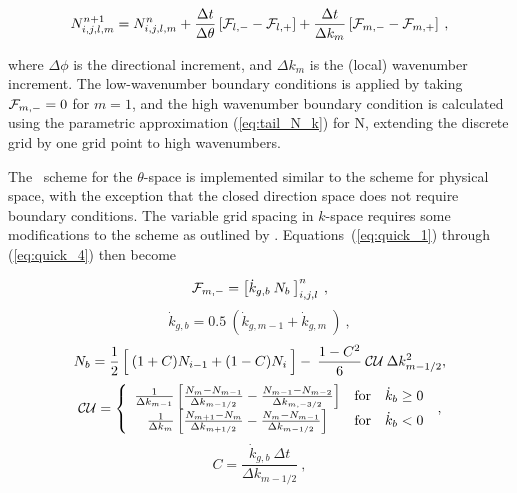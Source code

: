 
\begin{equation}
N_{i,j,l,m}^{n+1} = N_{i,j,l,m}^n 
 + \frac{\Delta t}{\Delta \theta} \left [ {\cal F}_{l,-} - {\cal F}_{l,+} \right ]
 + \frac{\Delta t}{\Delta k_m} \left [ {\cal F}_{m,-} - {\cal F}_{m,+} \right ]
\: , \label{eq:1up_intra_tot} \end{equation}

\noindent
where $\Delta \phi$ is the directional increment, and $\Delta k_m$ is the
(local) wavenumber increment. The low-wavenumber boundary conditions is
applied by taking ${\cal F}_{m,-}=0$ for $m=1$, and the high wavenumber boundary
condition is calculated using the parametric approximation (\ref{eq:tail_N_k})
for N, extending the discrete grid by one grid point to high wavenumbers.

\vspace{\baselineskip} \noindent
The \uq\ scheme for the $\theta$-space is implemented similar to the scheme
for physical space, with the exception that the closed direction space does
not require boundary conditions. The variable grid spacing in $k$-space
requires some modifications to the scheme as outlined by
\cite[{Appendix}]{art:Leo79}. Equations~(\ref{eq:quick_1}) through
(\ref{eq:quick_4}) then become


\begin{equation}
{\cal F}_{m,-} = \left [ \dot{k}_{g,b} \: N_b \: \right ]^n_{i,j,l}
\: , \label{eq:quick_1k}\end{equation} \begin{equation}
\dot{k}_{g,b} = 0.5 \: \left ( \dot{k}_{g,m-1} + \dot{k}_{g,m} 
\: \right )  \: , \label{eq:quick_1ak}
\end{equation} \begin{equation}
N_b = \frac{1}{2} \left [ \rule[0mm]{0mm}{\baselineskip} \: 
(1+C)N_{i-1} + (1-C)N_i \: \right ] - \:
\frac{1-C^2}{6} \: {\cal CU} \: \Delta k^2_{m-1/2}, \label{eq:quick_2k} \end{equation} \begin{equation}
{\cal CU} =  \left \{ \begin{array}{ccc}
\frac{1}{\Delta k_{m-1}}
\left [ \frac{N_{ m }-N_{m-1}}{\Delta k_{m-1/2}} - 
        \frac{N_{m-1}-N_{m-2}}{\Delta k_{m,-3/2}} \right ]
               & \mbox{for} & \dot{k}_b \geq 0 \\
\frac{1}{\Delta k_m}
\left [ \frac{N_{m+1}-N_{ m }}{\Delta k_{m+1/2}} -
       \frac{N_{ m }-N_{m-1}}{\Delta k_{m-1/2}} \right ]
               & \mbox{for} & \dot{k}_b   <  0
\end{array} \right . \: , \label{eq:quick_3k}
\end{equation} \begin{equation}
C = \frac{\dot{k}_{g,b} \: \Delta t}{\Delta k_{m-1/2}}
\: , \label{eq:quick_4k} \end{equation}

